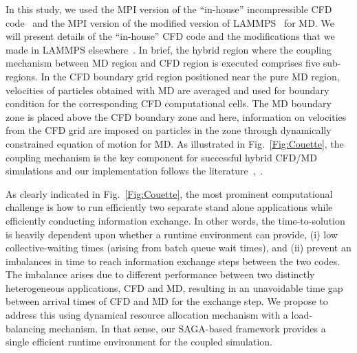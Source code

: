 \documentclass[conference,final]{IEEEtran}
\begin{document}
In this study, we used the MPI version of the ``in-house''
incompressible CFD code~\cite{Lee} and the MPI version of the modified
version of LAMMPS~\cite{LAMMPS} for MD. We will present details of the
``in-house'' CFD code and the modifications that we made in LAMMPS
elsewhere~\cite{jocs_in_prep}. In brief, the hybrid region where the
coupling mechanism between MD region and CFD region is executed
comprises five sub-regions. In the CFD boundary grid region positioned
near the pure MD region, velocities of particles obtained with MD are
averaged and used for boundary condition for the corresponding CFD
computational cells. The MD boundary zone is placed above the CFD
boundary zone and here, information on velocities from the CFD grid
are imposed on particles in the zone through dynamically constrained
equation of motion for MD. As illustrated in Fig.~\ref{Fig:Couette},
the coupling mechanism is the key component for successful hybrid
CFD/MD simulations and our implementation follows the
literature~\cite{Nie},~\cite{Yen}.



As clearly indicated in Fig.~\ref{Fig:Couette}, the most prominent
computational challenge is how to run efficiently two separate stand
alone applications while efficiently conducting information exchange.
In other words, the time-to-solution is heavily dependent upon whether
a runtime environment can provide, (i) low collective-waiting times
(arising from batch queue wait times), and (ii) prevent an imbalances
in time to reach information exchange steps between the two codes. The
imbalance arises due to different performance between two distinctly
heterogeneous applications, CFD and MD, resulting in an unavoidable
time gap between arrival times of CFD and MD for the exchange step. We
propose to address this using dynamical resource allocation mechanism
with a load-balancing mechanism. In that sense, our SAGA-based
framework provides a single efficient runtime environment for the
coupled simulation.
\end{document}
